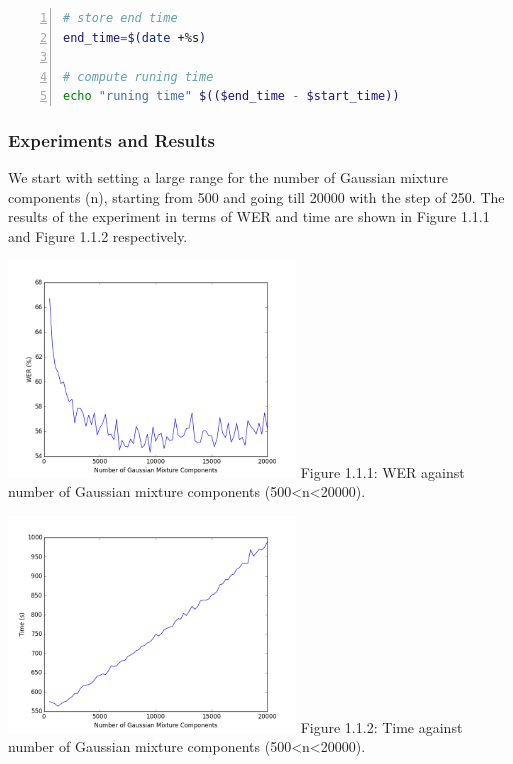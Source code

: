 \documentclass[]{article}
\begin{document}
\begin{multicols*}{2}
\begin{lstlisting}[language=sh,showstringspaces=false,numbers=left,tabsize=4, xleftmargin=\parindent, frame=single, basicstyle=\tiny]
# store end time
end_time=$(date +%s)

# compute runing time
echo "runing time" $(($end_time - $start_time))

\end{lstlisting}


\subsubsection{Experiments and Results}
We start with setting a large range for the number of Gaussian mixture components (n), starting from 500  and going till 20000 with the step of 250. The results of the experiment in terms of WER and time are shown in Figure 1.1.1 and Figure 1.1.2 respectively.

\begin{center}
\includegraphics[width=3in]{figure_1_WER.png} 
Figure 1.1.1: WER against number of Gaussian mixture components (500<n<20000).
\end{center}

\begin{center}
\includegraphics[width=3in]{figure_1.png} 
Figure 1.1.2: Time against number of Gaussian mixture components (500<n<20000).
\end{center}


\end{multicols*}
\end{document}

